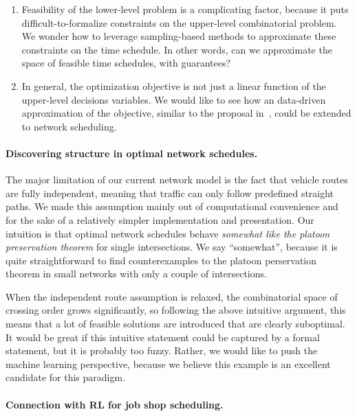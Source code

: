 \documentclass[a4paper]{report}
\theoremstyle{definition}
\theoremstyle{plain}
\begin{document}
\begin{enumerate}
  \item Feasibility of the lower-level problem is a complicating factor, because
        it puts difficult-to-formalize constraints on the upper-level
        combinatorial problem.
        We wonder how to leverage sampling-based methods to approximate these
        constraints on the time schedule.
        In other words, can we approximate the space of feasible time schedules,
        with guarantees?

  \item In general, the optimization objective is not just a linear function of
        the upper-level decisions variables.
        We would like to see how an data-driven approximation of the objective,
        similar to the proposal
        in~\cite{hultApproximateSolutionOptimal2015,hultTechnicalReportApproximate},
        could be extended to network scheduling.
\end{enumerate}


\paragraph{Discovering structure in optimal network schedules.}

The major limitation of our current network model is the fact that vehicle
routes are fully independent, meaning that traffic can only follow predefined
straight paths.
%
We made this assumption mainly out of computational convenience and for the sake
of a relatively simpler implementation and presentation.
%
Our intuition is that optimal network schedules behave \emph{somewhat like the
  platoon preservation theorem} for single intersections.
%
We say ``somewhat'', because it is quite straightforward to find counterexamples
to the platoon perservation theorem in small networks with only a couple of
intersections.

When the independent route assumption is relaxed, the combinatorial space of
crossing order grows significantly, so following the above intuitive argument,
this means that a lot of feasible solutions are introduced that are clearly
suboptimal.
%
It would be great if this intuitive statement could be captured by a formal
statement, but it is probably too fuzzy.
%
Rather, we would like to push the machine learning perspective, because we
believe this example is an excellent candidate for this paradigm.


\paragraph{Connection with RL for job shop scheduling.}
\end{document}
